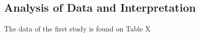 
\subsection{Analysis of Data and Interpretation}\label{analysis_of_data}



The data of the first study is found on Table X